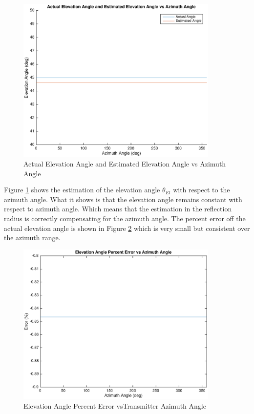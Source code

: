 \begin{figure}
	\begin{center}
		\includegraphics[width=10cm]{images/results/Elevation_angle_comparason_Azimuth_range.eps}
		\caption{Actual Elevation Angle and Estimated Elevation Angle vs Azimuth Angle}
		\label{fig:elevation_comparason_azimuth_range}
	\end{center}
\end{figure}

Figure \ref{fig:elevation_comparason_azimuth_range} shows the estimation of the elevation angle $\theta_{El}$ with respect to the azimuth angle. What it shows is that the elevation angle remains constant with respect to azimuth angle. Which means that the estimation in the reflection radius is correctly compensating for the azimuth angle. The percent error off the actual elevation angle is shown in Figure \ref{fig:percent_error_elevation_azimuth_range} which is very small but consistent over the azimuth range.

\begin{figure}
	\begin{center}
		\includegraphics[width=10cm]{images/results/Elevation_angle_percent_error_Azimuth_range.eps}
		\caption{Elevation Angle Percent Error vsTransmitter Azimuth Angle}
		\label{fig:percent_error_elevation_azimuth_range}
	\end{center}
\end{figure}

